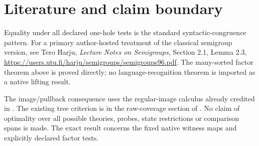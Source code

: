 \documentclass[11pt]{article}
\begin{document}
\section{Literature and claim boundary}
Equality under all declared one-hole tests is the standard syntactic-congruence pattern. For a primary author-hosted treatment of the classical semigroup version, see Tero Harju, \emph{Lecture Notes on Semigroups}, Section 2.1, Lemma 2.3, \url{https://users.utu.fi/harju/semigroups/semigroups96.pdf}. The many-sorted factor theorem above is proved directly; no language-recognition theorem is imported as a native lifting result.

The image/pullback consequence uses the regular-image calculus already credited in . The existing tree criterion is in the raw-coverage section of . No claim of optimality over all possible theories, probes, state restrictions or comparison spans is made. The exact result concerns the fixed native witness maps and explicitly declared factor tests.
\end{document}
